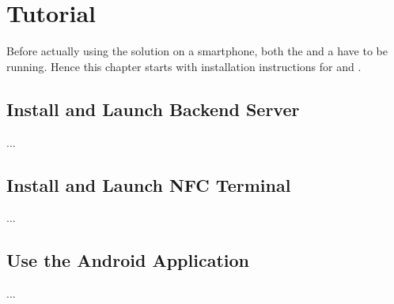 \section{Tutorial}\label{sec:tutorial}

Before actually using the \app solution on a smartphone, both the \be and a \ter have to be running.
Hence this chapter starts with installation instructions for \be and \ter.

\subsection{Install and Launch Backend Server}

...

\subsection{Install and Launch NFC Terminal}

...

\subsection{Use the Android Application}

...
